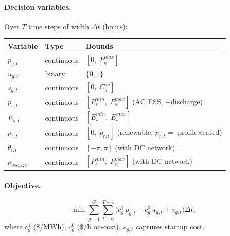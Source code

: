 \paragraph{Decision variables.}
Over $T$ time steps of width $\Delta t$ (hours):
\begin{center}
\begin{tabular}{lll}
\hline\hline
\textbf{Variable} & \textbf{Type} & \textbf{Bounds} \\
\hline
$p_{g,t}$ & continuous & $[0,\;P_g^{max}]$ \\
$u_{g,t}$ & binary & $\{0,1\}$ \\
$s_{g,t}$ & continuous & $[0,\;C_g^{su}]$ \\
$p_{s,t}$ & continuous & $[P_s^{min},\;P_s^{max}]$ (AC ESS, $+$discharge) \\
$E_{s,t}$ & continuous & $[E_s^{min},\;E_s^{max}]$ \\
$p_{r,t}$ & continuous & $[0,\;\bar{p}_{r,t}]$ (renewable, $\bar{p}_{r,t}=$ profile$\times$rated) \\
$\theta_{i,t}$ & continuous & $[-\pi,\pi]$ (with DC network) \\
$p_{vsc,c,t}$ & continuous & $[P_c^{min},\;P_c^{max}]$ (with DC network) \\
\hline\hline
\end{tabular}
\end{center}

\paragraph{Objective.}
\begin{equation}
  \min \sum_{g=1}^G\sum_{t=0}^{T-1}
    \bigl(c_g^1\,p_{g,t} + c_g^0\,u_{g,t} + s_{g,t}\bigr)\Delta t,
  \label{eq:uc-obj}
\end{equation}
where $c_g^1$ (\$/MWh), $c_g^0$ (\$/h on-cost), $s_{g,t}$ captures startup cost.

